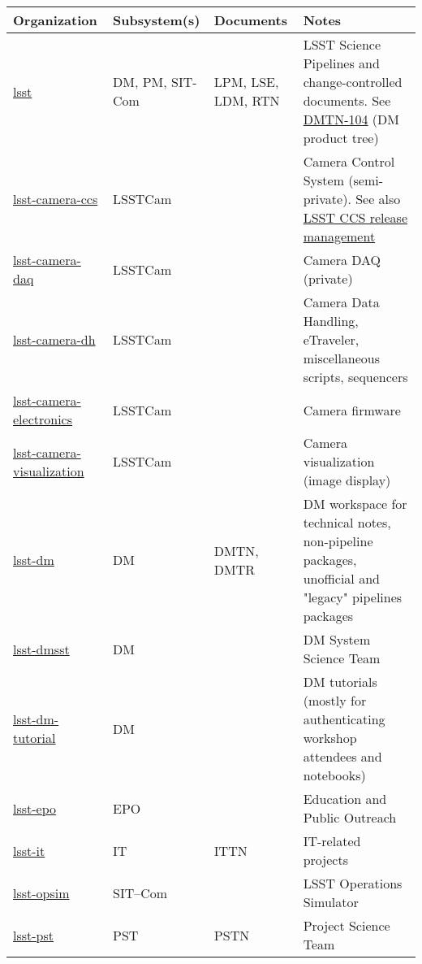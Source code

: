 \begin{small}

\begin{longtable}{p{}p{}p{}p{}}\hline
\textbf{Organization} & \textbf{Subsystem(s)} & \textbf{Documents} & \textbf{Notes}\\\hline
\href{https://github.com/lsst}{lsst}		& DM, PM, SIT-Com	&	LPM, LSE, LDM, RTN	&	LSST Science Pipelines and change-controlled documents. See \href{https://dmtn-104.lsst.io/}{DMTN-104} (DM product tree) \\\hline
\href{https://github.com/lsst-camera-ccs}{lsst-camera-ccs}			& LSSTCam	& &	Camera Control System (semi-private). See also \href{https://srs.slac.stanford.edu/releaseManagement/}{LSST CCS release management} \\\hline
\href{https://github.com/lsst-camera-daq}{lsst-camera-daq}		& LSSTCam 	& &	Camera DAQ (private) \\\hline
\href{https://github.com/lsst-camera-dh}{lsst-camera-dh}			& LSSTCam  	& &	Camera Data Handling, eTraveler, miscellaneous scripts, sequencers \\\hline
\href{https://github.com/lsst-camera-electronics}{lsst-camera-electronics}	& LSSTCam	& &	Camera firmware \\\hline
\href{https://github.com/lsst-camera-visualization}{lsst-camera-visualization}	& LSSTCam	& &	Camera visualization (image display) \\\hline
\href{https://github.com/lsst-dm}{lsst-dm}				& DM		& 	DMTN, DMTR	& DM workspace for technical notes, non-pipeline packages, unofficial and "legacy" pipelines packages \\\hline
\href{https://github.com/lsst-dmsst}{lsst-dmsst}				& DM		& & 	DM System Science Team \\\hline
\href{https://github.com/lsst-dm-tutorial}{lsst-dm-tutorial}			& DM		& &	DM tutorials (mostly for authenticating workshop attendees and notebooks) \\\hline
\href{https://github.com/lsst-epo}{lsst-epo}				& EPO		& &	Education and Public Outreach \\\hline
\href{https://github.com/lsst-it}{lsst-it}					& IT			&	ITTN		& IT-related projects \\\hline
\href{https://github.com/lsst-opsim}{lsst-opsim}				& SIT--Com	& &	LSST Operations Simulator \\\hline
\href{https://github.com/lsst-pst}{lsst-pst}				& PST		& PSTN	& Project Science Team \\\hline

\end{longtable}
\end{small}
